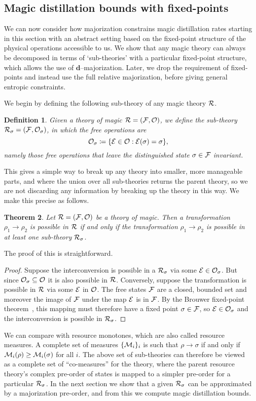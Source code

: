 \documentclass[
onecolumn,
superscriptaddress
]{revtex4-1}
\newcommand{\revhigh}[1]{{\color{red}#1}}
\newtheorem{theorem}{Theorem}
\newtheorem{definition}[theorem]{Definition}
\def\d{\boldsymbol{d}}
\def\E{{\cal E}}
\def\R{{\cal R}}
\def\M{{\cal M}}
\def\F{{\cal F}}
\renewcommand{\O}{{\cal O}}
\begin{document}
\subsection*{Magic distillation bounds with fixed-points}

We can now consider how majorization constrains magic distillation rates starting in this section with an abstract setting based on the fixed-point structure of the physical operations accessible to us. We show that any magic theory can always be decomposed in terms of `sub-theories' with a particular fixed-point structure, which allows the use of $\d$--majorization. 
\revhigh{Later, we drop the requirement of fixed-points and instead use the full relative majorization, before giving general entropic constraints.}
 
 We begin by defining the following sub-theory of any magic theory $\R$.
\begin{definition}\label{def:sigmafrag}
   Given a theory of magic $\R = (\F, \O)$, we define the sub-theory $\R_\sigma = (\F, \O_\sigma)$, in which the free operations are 
   \begin{equation}
        \O_\sigma \coloneqq \{ \E \in \O: \E(\sigma) = \sigma \},
    \end{equation}
namely those free operations that leave the distinguished state $\sigma \in \F$ invariant.
\end{definition}
This gives a simple way to break up any theory into smaller, more manageable parts, and where the union over all sub-theories returns the parent theory, so we are not discarding any information by breaking up the theory in this way. We make this precise as follows.
\begin{theorem}\label{thm:frag}
    Let $\R = (\F, \O)$ be a theory of magic.
Then a transformation $\rho_1 \rightarrow \rho_2$ is possible in $\R$ if and only if the transformation $\rho_1 \rightarrow \rho_2$ is possible in at least one sub-theory $\R_\sigma$.
\end{theorem}
The proof of this is straightforward.
\begin{proof}
   Suppose the interconversion is possible in a $\R_\sigma$ via some $\E \in \O_\sigma$. But since $\O_\sigma \subseteq \O$ it is also possible in $\R$. Conversely, suppose the transformation is possible in $\R$ via some $\E$ in $\O$. The free states $\F$ are a closed, bounded set and moreover the image of $\F$ under the map $\E$ is in $\F$. By the Brouwer fixed-point theorem~\cite{cit:brouwer}, this mapping must therefore have a fixed point $\sigma \in \F$, so $\E \in \O_\sigma$ and the interconversion is possible in $\R_\sigma$.
\end{proof}
We can compare with resource monotones, which are also called resource measures. A complete set of measures $\{\M_i\}_i$ is such that $\rho \rightarrow \sigma$ if and only if $\M_i(\rho) \ge \M_i(\sigma)$ for all $i$. The above set of sub-theories can therefore be viewed as a complete set of ``co-measures'' for the theory, where the parent resource theory's complex pre-order of states is mapped to a simpler pre-order for a particular $\R_\sigma$. 
In the next section we show that a given $\R_\sigma$ can be approximated by a majorization pre-order, and from this we compute magic distillation bounds.
\end{document}
